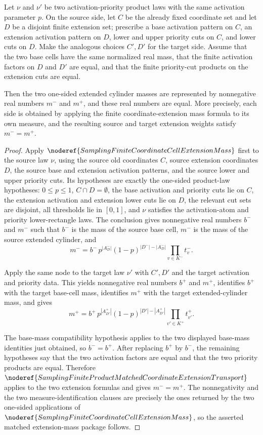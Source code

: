 \begin{lemma}
Let \(\nu\) and \(\nu'\) be two activation-priority product laws with the
same activation parameter \(p\).  On the source side, let \(C\) be the
already fixed coordinate set and let \(D\) be a disjoint finite extension
set; prescribe a base activation pattern on \(C\), an extension activation
pattern on \(D\), lower and upper priority cuts on \(C\), and lower cuts on
\(D\).  Make the analogous choices \(C',D'\) for the target side.  Assume
that the two base cells have the same normalized real mass, that the finite
activation factors on \(D\) and \(D'\) are equal, and that the finite
priority-cut products on the extension cuts are equal.

Then the two one-sided extended cylinder masses are represented by
nonnegative real numbers \(m^-\) and \(m^+\), and these real numbers are
equal.  More precisely, each side is obtained by applying the finite
coordinate-extension mass formula to its own measure, and the resulting
source and target extension weights satisfy \(m^-=m^+\).
\end{lemma}
\begin{proof}
Apply \(\noderef{SamplingFiniteCoordinateCellExtensionMass}\) first to the
source law \(\nu\), using the source old coordinates \(C\), source extension
coordinates \(D\), the source base and extension activation patterns, and the
source lower and upper priority cuts.  Its hypotheses are exactly the
one-sided product-law hypotheses: \(0\le p\le1\), \(C\cap D=\emptyset\), the
base activation and priority cuts lie on \(C\), the extension activation and
extension lower cuts lie on \(D\), the relevant cut sets are disjoint, all
thresholds lie in \([0,1]\), and \(\nu\) satisfies the activation-atom and
priority lower-rectangle laws.  The conclusion gives nonnegative real
numbers \(b^-\) and \(m^-\) such that \(b^-\) is the mass of the source base
cell, \(m^-\) is the mass of the source extended cylinder, and
\[
m^- =
b^-\,p^{|A^-_D|}(1-p)^{|D^-|-|A^-_D|}
  \prod_{v\in K^-} t^-_v .
\]

Apply the same node to the target law \(\nu'\) with \(C',D'\) and the target
activation and priority data.  This yields nonnegative real numbers \(b^+\)
and \(m^+\), identifies \(b^+\) with the target base-cell mass, identifies
\(m^+\) with the target extended-cylinder mass, and gives
\[
m^+ =
b^+\,p^{|A^+_{D'}|}(1-p)^{|D'|-|A^+_{D'}|}
  \prod_{v'\in K^+} t^+_{v'} .
\]

The base-mass compatibility hypothesis applies to the two displayed
base-mass identities just obtained, so \(b^-=b^+\).  After replacing \(b^+\)
by \(b^-\), the remaining hypotheses say that the two activation factors are
equal and that the two priority products are equal.  Therefore
\(\noderef{SamplingFiniteProductMatchedCoordinateExtensionTransport}\)
applies to the two extension formulas and gives \(m^-=m^+\).  The
nonnegativity and the two measure-identification clauses are precisely the
ones returned by the two one-sided applications of
\(\noderef{SamplingFiniteCoordinateCellExtensionMass}\), so the asserted
matched extension-mass package follows.
\end{proof}
